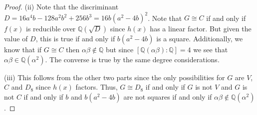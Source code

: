 \documentclass{article}
\begin{document}
\begin{proof}
(ii) Note that the discriminant $D = 16a^4b - 128a^2b^2 + 256b^3 = 16b(a^2-4b)^2$. Note that $G \cong C$ if and only if $f(x)$ is reducible over $\mathbb{Q}(\sqrt{D})$ since $h(x)$ has a linear factor. But given the value of $D$, this is true if and only if $b(a^2-4b)$ is a square. Additionally, we know that if $G \cong C$ then $\alpha \beta \notin \mathbb{Q}$ but since $[\mathbb{Q}(\alpha \beta) : \mathbb{Q}] = 4$ we see that $\alpha \beta \in \mathbb{Q}(\alpha^2)$. The converse is true by the same degree considerations.

(iii) This follows from the other two parts since the only possibilities for $G$ are $V$, $C$ and $D_8$ since $h(x)$ factors. Thus, $G \cong D_8$ if and only if $G$ is not $V$ and $G$ is not $C$ if and only if $b$ and $b(a^2-4b)$ are not squares if and only if $\alpha \beta \notin \mathbb{Q}(\alpha^2)$.
\end{proof}
\end{document}
